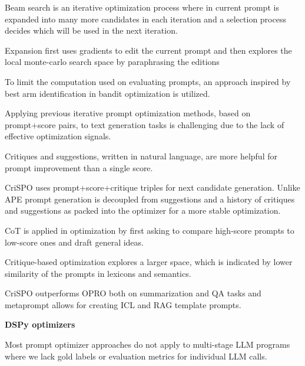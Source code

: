 Beam search is an iterative optimization process where in current prompt is expanded into many more candidates in each iteration and a selection process decides which will be used in the next iteration. \cite{pryzant2023automaticpromptoptimizationgradient}

Expansion first uses gradients to edit the current prompt and then explores the local monte-carlo search space by paraphrasing the editions \cite{pryzant2023automaticpromptoptimizationgradient}

To limit the computation used on evaluating prompts, an approach inspired by best arm identification in bandit optimization is utilized. \cite{pryzant2023automaticpromptoptimizationgradient}


Applying previous iterative prompt optimization methods, based on prompt+score pairs, to text generation tasks is challenging due to the lack of effective optimization signals. \cite{he2024crispomultiaspectcritiquesuggestionguidedautomatic}

Critiques and suggestions, written in natural language, are more helpful for prompt improvement than a single score.\cite{he2024crispomultiaspectcritiquesuggestionguidedautomatic}

CriSPO uses prompt+score+critique triples for next candidate generation. \cite{he2024crispomultiaspectcritiquesuggestionguidedautomatic}
Unlike APE \cite{pryzant2023automaticpromptoptimizationgradient} prompt generation is decoupled from suggestions and a history of critiques and suggestions as packed into the optimizer for a more stable optimization. \cite{he2024crispomultiaspectcritiquesuggestionguidedautomatic}

CoT is applied in optimization by first asking to compare high-score prompts to low-score ones and draft general ideas. \cite{he2024crispomultiaspectcritiquesuggestionguidedautomatic}

Critique-based optimization explores a larger space, which is indicated by lower similarity of the prompts in lexicons and semantics.\cite{he2024crispomultiaspectcritiquesuggestionguidedautomatic}

CriSPO outperforms OPRO \cite{yang2024largelanguagemodelsoptimizers} both on summarization and QA tasks and metaprompt allows for creating ICL and RAG template prompts. \cite{he2024crispomultiaspectcritiquesuggestionguidedautomatic}

\textbf{DSPy optimizers}

Most prompt optimizer approaches do not apply to multi-stage LLM programs where we lack gold labels or evaluation metrics for individual LLM calls. \cite{opsahlong2024optimizinginstructionsdemonstrationsmultistage}

